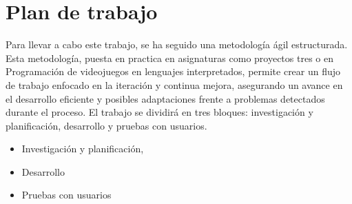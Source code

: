 \section{Plan de trabajo}
Para llevar a cabo este trabajo, se ha seguido una metodología ágil estructurada. Esta metodología, puesta en practica en asignaturas como proyectos tres o en Programación de videojuegos en lenguajes interpretados, permite crear un flujo de trabajo enfocado en la iteración y continua mejora, asegurando un avance en el desarrollo eficiente y posibles adaptaciones frente a problemas detectados durante el proceso.
El trabajo se dividirá en tres bloques: investigación y planificación, desarrollo y pruebas con usuarios.
\begin{itemize}
    \item  Investigación y planificación,
    \item Desarrollo 
    \item Pruebas con usuarios
\end{itemize}
